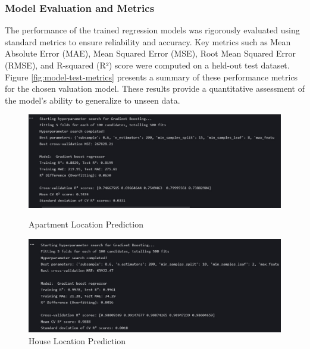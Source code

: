 \subsubsection{Model Evaluation and Metrics}
The performance of the trained regression models was rigorously evaluated using standard metrics to ensure reliability and accuracy. Key metrics such as Mean Absolute Error (MAE), Mean Squared Error (MSE), Root Mean Squared Error (RMSE), and R-squared (R²) score were computed on a held-out test dataset. Figure \ref{fig:model-test-metrics} presents a summary of these performance metrics for the chosen valuation model. These results provide a quantitative assessment of the model's ability to generalize to unseen data.


\begin{figure}[htbp]
    \centering
    \begin{minipage}{0.48\textwidth}
        \centering
        \includegraphics[width=\linewidth]{images/apartmenet location.jpeg}
        \caption*{Apartment Location Prediction}
    \end{minipage}
    \hfill
    \begin{minipage}{0.48\textwidth}
        \centering
        \includegraphics[width=\linewidth]{images/maison location.jpeg}
        \caption*{House Location Prediction}
    \end{minipage}
    
    \vspace{0.5cm}
    

\end{figure}
